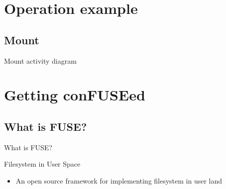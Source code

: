 \documentclass{beamer}
\begin{document}
\section{Operation example}

\subsection{Mount}

\begin{frame}{Mount activity diagram}
	
	
\end{frame}


\section{Getting conFUSEed}

\subsection{What is FUSE?}

\begin{frame}{What is FUSE?}

	\begin{block}{Filesystem in User Space}

		\begin{itemize}[<+->]

			\item{An open source framework for implementing filesystem in user land}\footnotemark[1]
	
		\end{itemize}

	\end{block}


\end{frame}
\end{document}
